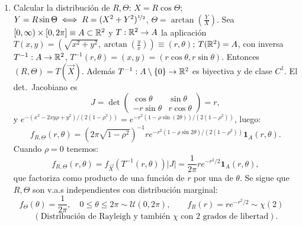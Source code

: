 \begin{enumerate}
\begin{enumerate}[label=(\alph*)]
                  \[
                  \E(CA) = 2\E(X^2 Y + X Y^2) = 4\E(X^2 Y) = 4\E(X^2)\E(Y) = \frac{4}{6} = \frac{2}{3}, \]\[ \Cov(A, C) = \frac{2}{3} - \frac{1}{4} \times 2 = \frac{1}{6}\]
                \[
                  \rho = \frac{1/6}{\sqrt{(2/3) \times 7/(16 \times 9)}} = \sqrt{\frac{6}{7}} \approx 0{,}93.
                \]
                Si $X, Y$ son uniformes en $(0, a)$ podemos reescalar $X \equiv aX'$, $Y = aY'$ con $X', Y' \sim \mathcal{U}(0,1)$. Luego:
                \[
                  \E C = 2a, \quad \E A = \frac{a^2}{4}, \quad \Var(A) = \frac{7a^4}{144}, \quad \Var(C) = \frac{2a^2}{3},
                  \]
                  \[ \E(CA) = \frac{2a^3}{3}, \quad \Cov(A, C) = \frac{a^3}{6},
                \]
                \[
                  \rho = \frac{a^3/6}{\sqrt{(\frac{2a^2}{3}) \times \frac{7a^4}{144}}} = \sqrt{\frac{6}{7}} \quad \left(\text{en notas: } \sqrt{\frac{6}{7a}} \xrightarrow{a\to\infty} 0\right).
                \]
          \item Recta de regresión $\mathcal{L}_Y \coloneqq \left\{(x,y) \in \R^2 : y - \mu_Y = \rho\frac{\sigma_Y}{\sigma_X}(x - \mu_X)\right\}$:
                \[
                  A - \frac{1}{4} = \sqrt{\frac{6}{7}}\,(P - 2)\sqrt{\frac{7 \times 3}{2 \times 144}}; \qquad \min_{a,b} \E(Y - (a + bX))^2 = \frac{1}{144}.
                \]
        \end{enumerate}

  \item Calcular la distribución de $R, \Theta$: $X = R\cos\Theta$; $Y = R\sin\Theta \iff R = (X^2 + Y^2)^{\nicefrac{1}{2}}$, $\Theta = \arctan\left(\frac{Y}{X}\right)$.
        Sea $[0, \infty) \times [0, 2\pi] \equiv A \subset \mathbb{R}^2$ y $T : \mathbb{R}^2 \to A$ la aplicación $T(x,y) = \left(\sqrt{x^2 + y^2}, \arctan\left(\frac{y}{x}\right)\right) \equiv (r, \theta)$; $T(\mathbb{R}^2) = A$, con inversa $T^{-1} : A \to \mathbb{R}^2$, $T^{-1}(r, \theta) = (x,y) = (r\cos\theta, r\sin\theta)$.
        Entonces $(R, \Theta) = T(\vec{X})$. Además $T^{-1} : A \setminus \{0\} \to \mathbb{R}^2$ es biyectiva y de clase $C^1$. El det.\ Jacobiano es
        \[
          J = \det\begin{pmatrix} \cos\theta & \sin\theta \\ -r\sin\theta & r\cos\theta \end{pmatrix} = r,
        \]
        y $e^{-(x^2 - 2xy\rho + y^2)/(2(1-\rho^2))} = e^{-r^2(1 - \rho\sin(2\theta))/(2(1-\rho^2))}$, luego:
        \[
          f_{R,\Theta}(r, \theta) = \left(2\pi\sqrt{1-\rho^2}\right)^{-1} r e^{-r^2(1 - \rho\sin 2\theta)/(2(1-\rho^2))} \mathbf{1}_A(r,\theta).
        \]
        Cuando $\rho = 0$ tenemos:
        \[
          f_{R,\Theta}(r, \theta) = f_{\vec{X}}(T^{-1}(r, \theta))|J| = \frac{1}{2\pi} r e^{-r^2/2}\mathbf{1}_A(r,\theta),
        \]
        que factoriza como producto de una función de $r$ por una de $\theta$. Se sigue que $R, \Theta$ son v.a.s independientes con distribución marginal:
        \[
          f_\Theta(\theta) = \frac{1}{2\pi}, \quad 0 \le \theta \le 2\pi \sim \mathcal{U}(0, 2\pi), \qquad f_R(r) = r e^{-r^2/2} \sim \chi(2) \quad \]\[(\text{Distribución de Rayleigh y también } \chi \text{ con } 2 \text{ grados de libertad}).
        \]


\end{enumerate}
